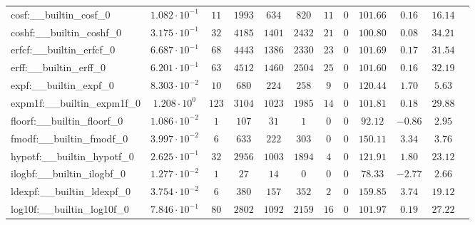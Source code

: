 \begin{tabular}{|l|c|c|c|c|c|c|c|c|c|c|c|}
cosf:\_\_builtin\_cosf\_0                 & $ 1.082 \cdot 10^{-1} $ & $ 11     $ & $ 1993  $ & $ 634   $ & $ 820   $ & $ 11  $ & $ 0 $ & $ 101.66      $ & $ 0.16    $ & $ 16.14   $ \\
coshf:\_\_builtin\_coshf\_0               & $ 3.175 \cdot 10^{-1} $ & $ 32     $ & $ 4185  $ & $ 1401  $ & $ 2432  $ & $ 21  $ & $ 0 $ & $ 100.80      $ & $ 0.08    $ & $ 34.21   $ \\
erfcf:\_\_builtin\_erfcf\_0               & $ 6.687 \cdot 10^{-1} $ & $ 68     $ & $ 4443  $ & $ 1386  $ & $ 2330  $ & $ 23  $ & $ 0 $ & $ 101.69      $ & $ 0.17    $ & $ 31.54   $ \\
erff:\_\_builtin\_erff\_0                 & $ 6.201 \cdot 10^{-1} $ & $ 63     $ & $ 4512  $ & $ 1460  $ & $ 2504  $ & $ 25  $ & $ 0 $ & $ 101.60      $ & $ 0.16    $ & $ 32.19   $ \\
expf:\_\_builtin\_expf\_0                 & $ 8.303 \cdot 10^{-2} $ & $ 10     $ & $ 680   $ & $ 224   $ & $ 258   $ & $ 9   $ & $ 0 $ & $ 120.44      $ & $ 1.70    $ & $ 5.63    $ \\
expm1f:\_\_builtin\_expm1f\_0             & $ 1.208 \cdot 10^{0}  $ & $ 123    $ & $ 3104  $ & $ 1023  $ & $ 1985  $ & $ 14  $ & $ 0 $ & $ 101.81      $ & $ 0.18    $ & $ 29.88   $ \\
floorf:\_\_builtin\_floorf\_0             & $ 1.086 \cdot 10^{-2} $ & $ 1      $ & $ 107   $ & $ 31    $ & $ 1     $ & $ 0   $ & $ 0 $ & $ 92.12       $ & $ -0.86   $ & $ 2.95    $ \\
fmodf:\_\_builtin\_fmodf\_0               & $ 3.997 \cdot 10^{-2} $ & $ 6      $ & $ 633   $ & $ 222   $ & $ 303   $ & $ 0   $ & $ 0 $ & $ 150.11      $ & $ 3.34    $ & $ 3.76    $ \\
hypotf:\_\_builtin\_hypotf\_0             & $ 2.625 \cdot 10^{-1} $ & $ 32     $ & $ 2956  $ & $ 1003  $ & $ 1894  $ & $ 4   $ & $ 0 $ & $ 121.91      $ & $ 1.80    $ & $ 23.12   $ \\
ilogbf:\_\_builtin\_ilogbf\_0             & $ 1.277 \cdot 10^{-2} $ & $ 1      $ & $ 27    $ & $ 14    $ & $ 0     $ & $ 0   $ & $ 0 $ & $ 78.33       $ & $ -2.77   $ & $ 2.66    $ \\
ldexpf:\_\_builtin\_ldexpf\_0             & $ 3.754 \cdot 10^{-2} $ & $ 6      $ & $ 380   $ & $ 157   $ & $ 352   $ & $ 2   $ & $ 0 $ & $ 159.85      $ & $ 3.74    $ & $ 19.12   $ \\
log10f:\_\_builtin\_log10f\_0             & $ 7.846 \cdot 10^{-1} $ & $ 80     $ & $ 2802  $ & $ 1092  $ & $ 2159  $ & $ 16  $ & $ 0 $ & $ 101.97      $ & $ 0.19    $ & $ 27.22   $ \\

\end{tabular}
